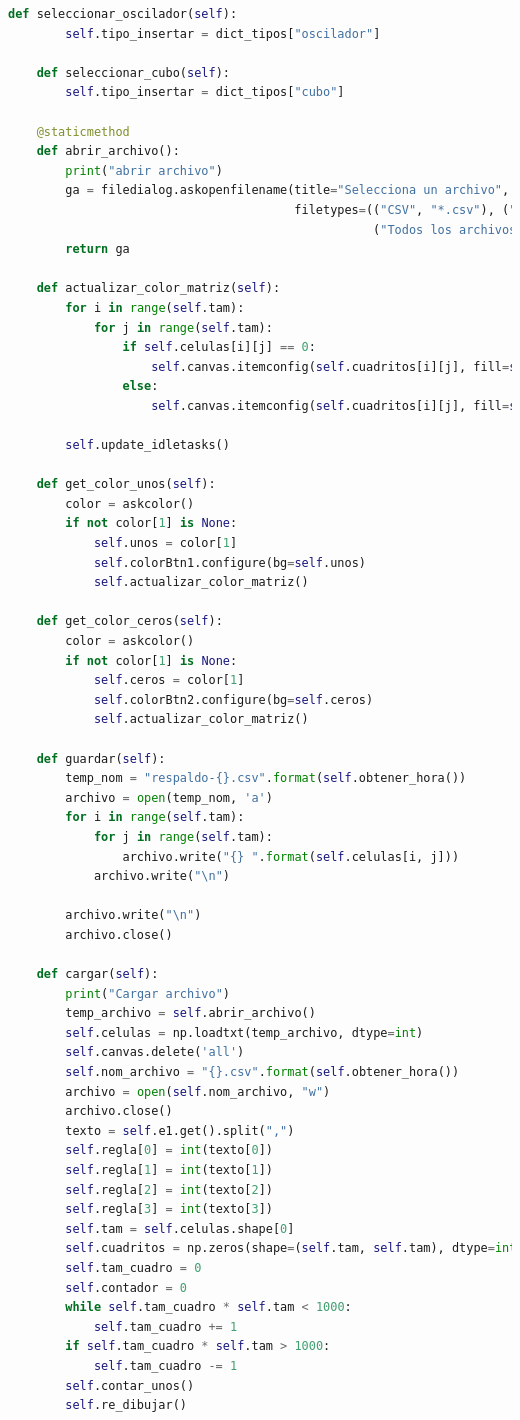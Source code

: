 \begin{lstlisting}[language=Python]
    def seleccionar_oscilador(self):
        self.tipo_insertar = dict_tipos["oscilador"]

    def seleccionar_cubo(self):
        self.tipo_insertar = dict_tipos["cubo"]

    @staticmethod
    def abrir_archivo():
        print("abrir archivo")
        ga = filedialog.askopenfilename(title="Selecciona un archivo",
                                        filetypes=(("CSV", "*.csv"), ("Archivo de texto", "*.txt"),
                                                   ("Todos los archivos", "*.*")))
        return ga

    def actualizar_color_matriz(self):
        for i in range(self.tam):
            for j in range(self.tam):
                if self.celulas[i][j] == 0:
                    self.canvas.itemconfig(self.cuadritos[i][j], fill=self.ceros)
                else:
                    self.canvas.itemconfig(self.cuadritos[i][j], fill=self.unos)

        self.update_idletasks()

    def get_color_unos(self):
        color = askcolor()
        if not color[1] is None:
            self.unos = color[1]
            self.colorBtn1.configure(bg=self.unos)
            self.actualizar_color_matriz()

    def get_color_ceros(self):
        color = askcolor()
        if not color[1] is None:
            self.ceros = color[1]
            self.colorBtn2.configure(bg=self.ceros)
            self.actualizar_color_matriz()

    def guardar(self):
        temp_nom = "respaldo-{}.csv".format(self.obtener_hora())
        archivo = open(temp_nom, 'a')
        for i in range(self.tam):
            for j in range(self.tam):
                archivo.write("{} ".format(self.celulas[i, j]))
            archivo.write("\n")

        archivo.write("\n")
        archivo.close()

    def cargar(self):
        print("Cargar archivo")
        temp_archivo = self.abrir_archivo()
        self.celulas = np.loadtxt(temp_archivo, dtype=int)
        self.canvas.delete('all')
        self.nom_archivo = "{}.csv".format(self.obtener_hora())
        archivo = open(self.nom_archivo, "w")
        archivo.close()
        texto = self.e1.get().split(",")
        self.regla[0] = int(texto[0])
        self.regla[1] = int(texto[1])
        self.regla[2] = int(texto[2])
        self.regla[3] = int(texto[3])
        self.tam = self.celulas.shape[0]
        self.cuadritos = np.zeros(shape=(self.tam, self.tam), dtype=int)
        self.tam_cuadro = 0
        self.contador = 0
        while self.tam_cuadro * self.tam < 1000:
            self.tam_cuadro += 1
        if self.tam_cuadro * self.tam > 1000:
            self.tam_cuadro -= 1
        self.contar_unos()
        self.re_dibujar()


\end{lstlisting}
